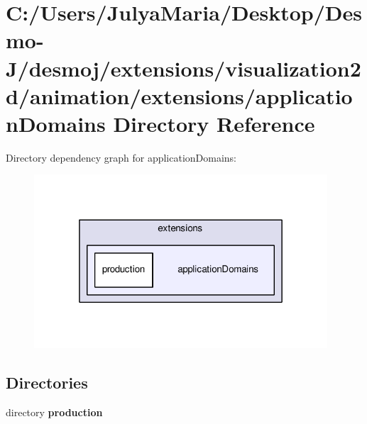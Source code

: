 \section{C\-:/\-Users/\-Julya\-Maria/\-Desktop/\-Desmo-\/\-J/desmoj/extensions/visualization2d/animation/extensions/application\-Domains Directory Reference}
\label{dir_f93b44276c3a6090d768630b5f80c92d}
Directory dependency graph for application\-Domains\-:
\nopagebreak
\begin{figure}[H]
\begin{center}
\leavevmode
\includegraphics[width=310pt]{dir_f93b44276c3a6090d768630b5f80c92d_dep}
\end{center}
\end{figure}
\subsection*{Directories}
\begin{DoxyCompactItemize}
\item 
directory {\bf production}
\end{DoxyCompactItemize}
